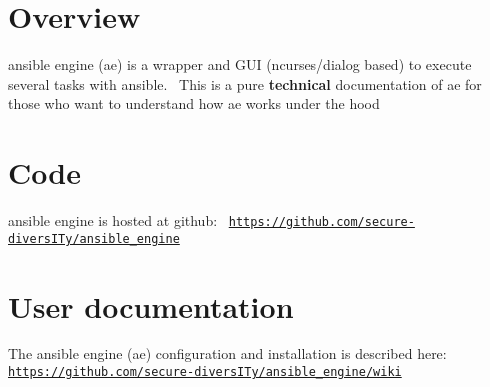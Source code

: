 \hypertarget{index_intro}{}\section{Overview}\label{index_intro}
ansible engine (ae) is a wrapper and G\+UI (ncurses/dialog based) to execute several tasks with ansible.~\newline
 This is a pure {\bfseries technical} documentation of ae for those who want to understand how ae works under the hood\hypertarget{index_code}{}\section{Code}\label{index_code}
ansible engine is hosted at github\+:~\newline
 \href{https://github.com/secure-diversITy/ansible_engine}{\tt https\+://github.\+com/secure-\/divers\+I\+Ty/ansible\+\_\+engine}\hypertarget{index_secintro}{}\section{User documentation}\label{index_secintro}
The ansible engine (ae) configuration and installation is described here\+: ~\newline
 \href{https://github.com/secure-diversITy/ansible_engine/wiki}{\tt https\+://github.\+com/secure-\/divers\+I\+Ty/ansible\+\_\+engine/wiki} 